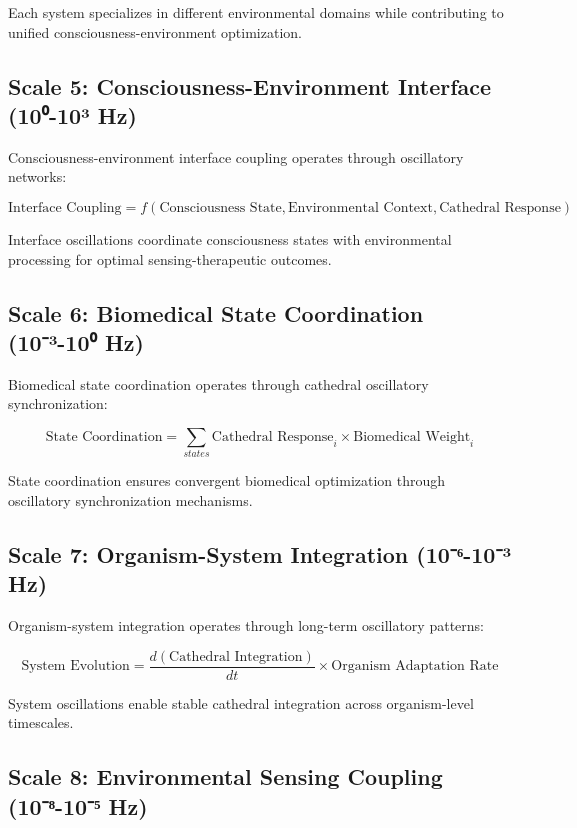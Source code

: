 \documentclass[12pt,a4paper]{article}
\begin{document}
Each system specializes in different environmental domains while contributing to unified consciousness-environment optimization.

\subsection{Scale 5: Consciousness-Environment Interface (10⁰-10³ Hz)}

Consciousness-environment interface coupling operates through oscillatory networks:

\begin{equation}
\text{Interface Coupling} = f(\text{Consciousness State}, \text{Environmental Context}, \text{Cathedral Response})
\end{equation}

Interface oscillations coordinate consciousness states with environmental processing for optimal sensing-therapeutic outcomes.

\subsection{Scale 6: Biomedical State Coordination (10⁻³-10⁰ Hz)}

Biomedical state coordination operates through cathedral oscillatory synchronization:

\begin{equation}
\text{State Coordination} = \sum_{states} \text{Cathedral Response}_i \times \text{Biomedical Weight}_i
\end{equation}

State coordination ensures convergent biomedical optimization through oscillatory synchronization mechanisms.

\subsection{Scale 7: Organism-System Integration (10⁻⁶-10⁻³ Hz)}

Organism-system integration operates through long-term oscillatory patterns:

\begin{equation}
\text{System Evolution} = \frac{d(\text{Cathedral Integration})}{dt} \times \text{Organism Adaptation Rate}
\end{equation}

System oscillations enable stable cathedral integration across organism-level timescales.

\subsection{Scale 8: Environmental Sensing Coupling (10⁻⁸-10⁻⁵ Hz)}
\end{document}
